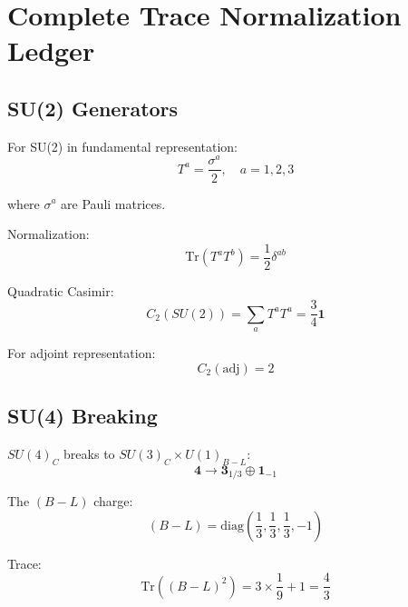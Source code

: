 \documentclass[11pt,a4paper]{article}
\begin{document}
\section{Complete Trace Normalization Ledger}
\label{app:trace-ledger}

\subsection{SU(2) Generators}
\label{app:su2-gen}

For SU(2) in fundamental representation:
\begin{equation}
\label{eq:su2-gen-def}
T^a = \frac{\sigma^a}{2}, \quad a = 1,2,3
\end{equation}

where $\sigma^a$ are Pauli matrices.

Normalization:
\begin{equation}
\label{eq:su2-trace}
\text{Tr}(T^a T^b) = \frac{1}{2}\delta^{ab}
\end{equation}

Quadratic Casimir:
\begin{equation}
\label{eq:su2-casimir}
C_2(SU(2)) = \sum_a T^a T^a = \frac{3}{4}\mathbf{1}
\end{equation}

For adjoint representation:
\begin{equation}
\label{eq:su2-adj-casimir}
C_2(\text{adj}) = 2
\end{equation}

\subsection{SU(4) Breaking}
\label{app:su4-break}

$SU(4)_C$ breaks to $SU(3)_C \times U(1)_{B-L}$:
\begin{equation}
\label{eq:su4-embed}
\mathbf{4} \to \mathbf{3}_{1/3} \oplus \mathbf{1}_{-1}
\end{equation}

The $(B-L)$ charge:
\begin{equation}
\label{eq:BL-charge-def}
(B-L) = \text{diag}\left(\frac{1}{3}, \frac{1}{3}, \frac{1}{3}, -1\right)
\end{equation}

Trace:
\begin{equation}
\label{eq:BL-trace-calc}
\text{Tr}((B-L)^2) = 3 \times \frac{1}{9} + 1 = \frac{4}{3}
\end{equation}
\end{document}
